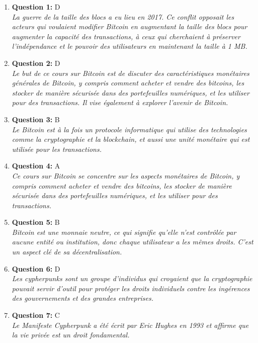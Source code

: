 \documentclass[12pt,a4paper]{article}
\begin{document}
\begin{enumerate}
\item \textbf{Question 1:} D
\\ \textit{La guerre de la taille des blocs a eu lieu en 2017. Ce conflit opposait les acteurs qui voulaient modifier Bitcoin en augmentant la taille des blocs pour augmenter la capacité des transactions, à ceux qui cherchaient à préserver l'indépendance et le pouvoir des utilisateurs en maintenant la taille à 1 MB.}

\item \textbf{Question 2:} D
\\ \textit{Le but de ce cours sur Bitcoin est de discuter des caractéristiques monétaires générales de Bitcoin, y compris comment acheter et vendre des bitcoins, les stocker de manière sécurisée dans des portefeuilles numériques, et les utiliser pour des transactions. Il vise également à explorer l'avenir de Bitcoin.}

\item \textbf{Question 3:} B
\\ \textit{Le Bitcoin est à la fois un protocole informatique qui utilise des technologies comme la cryptographie et la blockchain, et aussi une unité monétaire qui est utilisée pour les transactions.}

\item \textbf{Question 4:} A
\\ \textit{Ce cours sur Bitcoin se concentre sur les aspects monétaires de Bitcoin, y compris comment acheter et vendre des bitcoins, les stocker de manière sécurisée dans des portefeuilles numériques, et les utiliser pour des transactions.}

\item \textbf{Question 5:} B
\\ \textit{Bitcoin est une monnaie neutre, ce qui signifie qu'elle n'est contrôlée par aucune entité ou institution, donc chaque utilisateur a les mêmes droits. C'est un aspect clé de sa décentralisation.}

\item \textbf{Question 6:} D
\\ \textit{Les cypherpunks sont un groupe d'individus qui croyaient que la cryptographie pouvait servir d'outil pour protéger les droits individuels contre les ingérences des gouvernements et des grandes entreprises.}

\item \textbf{Question 7:} C
\\ \textit{Le Manifeste Cypherpunk a été écrit par Eric Hughes en 1993 et affirme que la vie privée est un droit fondamental.}


\end{enumerate}
\end{document}
